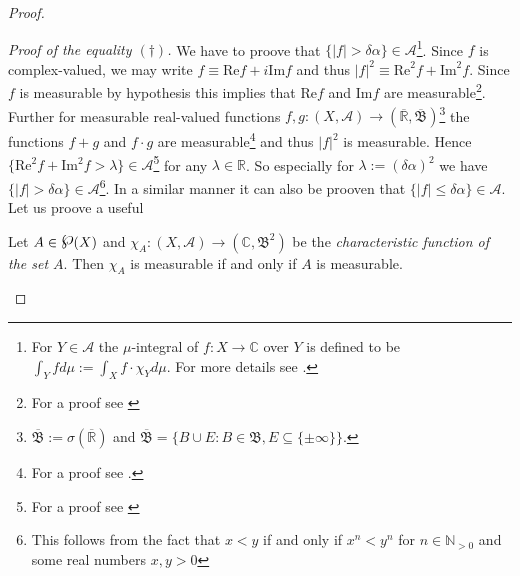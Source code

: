 \begin{proof}
\begin{enumerate}[label = \textbf{(\roman*.)}]
\begin{enumerate}[label = \textbf{\alph*.}]
	\emph{Proof of the equality $(\dagger)$.} We have to proove that $\{\vert f \vert > \delta\alpha\} \in \mathcal{A}$\footnote{
		For $Y \in \mathcal{A}$ the $\mu$-integral of $f: X \rightarrow \mathbb{C}$ over $Y$ is defined to be $\displaystyle \int_Y fd\mu := \int_X f \cdot \chi_Y d\mu$. For more details see \cite[135--136]{elstrodt:mass:2011}.}.
		Since $f$ is complex-valued, we may write $f \equiv \mathrm{Re} f + i\mathrm{Im}f$ and thus $\vert f\vert^2 \equiv \mathrm{Re}^2 f + \mathrm{Im}^2f$. Since $f$ is measurable by hypothesis this implies that $ \mathrm{Re} f$ and $\mathrm{Im}f$ are measurable\footnote{For a proof see \cite[106]{elstrodt:mass:2011}}. Further for measurable real-valued functions $f,g: (X,\mathcal{A}) \rightarrow (\overline{\mathbb{R}},\overline{\mathfrak{B}})$\footnote{$\overline{\mathfrak{B}} := \sigma(\overline{\mathbb{R}})$ and $\overline{\mathfrak{B}} = \{B \cup E : B \in \mathfrak{B}, E \subseteq \{\pm \infty\}\}$.} 
		the functions $f + g$ and $f \cdot g$ are measurable\footnote{For a proof see \cite[107]{elstrodt:mass:2011}.}
		and thus $\vert f \vert^2$ is measurable. Hence $\{ \mathrm{Re}^2 f + \mathrm{Im}^2f > \lambda\} \in \mathcal{A}$\footnote{For a proof see \cite[105--106]{elstrodt:mass:2011}} for any $\lambda \in \mathbb{R}$. So especially for $\lambda := (\delta\alpha)^2$ we have $\{\vert f \vert > \delta\alpha\} \in \mathcal{A}$\footnote{This follows from the fact that $x < y$ if and only if $x^n < y^n$ for $n \in \mathbb{N}_{>0}$ and some real numbers $x,y > 0$}.
	In a similar manner it can also be prooven that $\{\vert f\vert \leqslant \delta \alpha\} \in \mathcal{A}$. Let us proove a useful
	
	\vspace{2mm}
	
	\begin{mdframed}
		\begin{lemma}
			Let $A \in \powerset(X)$ and $\chi_A: (X,\mathcal{A}) \rightarrow (\mathbb{C},\mathfrak{B}^2)$ be the \emph{characteristic function of the set $A$}. Then $\chi_A$ is measurable if and only if $A$ is measurable.
			\label{lemma:charfun}
		\end{lemma}
	\end{mdframed}
	
	\vspace{2mm}
	

\end{enumerate}
\end{enumerate}
\end{proof}
